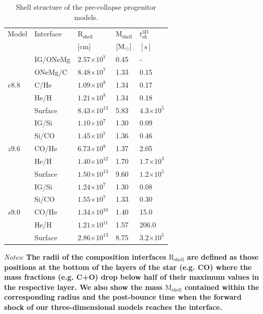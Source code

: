 \documentclass[fleqn,usenatbib]{mnras}
\newcommand{\solm}{\ensuremath{\rm{M_{\odot}}}\xspace}
\newcommand{\s}{\ensuremath{\text{s}}}
\begin{document}
\begin{table}
   \caption{Shell structure of the pre-collapse progenitor models.}
   \label{tab:progenitors}
   \begin{tabular}{l l l l l} 
   \hline
     Model      &Interface & $\mathrm{R_{shell}\,}$ & $\mathrm{M_{shell}}$ & $t_{\mathrm{sh}}^{\mathrm{3D}}$\\ [0.5ex] 
                &          & [cm] & $[\solm]$ & $[\s]$\\ [0.5ex] 
   \hline
   \multirow{5}{*}{$e8.8$} & IG/ONeMg & $2.57\mathord{\times} 10^{7}$  & 0.45 & - \\ 
                           & ONeMg/C    & $8.48\mathord{\times} 10^{7}$  & 1.33 & 0.15 \\
                           & C/He       & $1.09\mathord{\times} 10^{8}$  & 1.34 & 0.17 \\
                           & He/H       & $1.21\mathord{\times} 10^{8}$  & 1.34 & 0.18\\
                           & Surface    & $8.43\mathord{\times} 10^{13}$ & 5.83 & $4.3\mathord{\times}10^5$\\
   \hline
   \multirow{5}{*}{$z9.6$} & IG/Si    & $1.10\mathord{\times} 10^{7}$  & 1.30 & 0.09 \\ 
                           & Si/CO       & $1.45\mathord{\times} 10^{7}$  & 1.36 & 0.46\\ 
                           & CO/He      & $6.73\mathord{\times} 10^{8}$  & 1.37 & 2.05\\
                           & He/H       & $1.40\mathord{\times} 10^{12}$ & 1.70 & $1.7\mathord{\times}10^{3}$\\
                           & Surface    & $1.50\mathord{\times} 10^{13}$ & 9.60 & $1.2\mathord{\times}10^5$  \\
   \hline
   \multirow{5}{*}{$s9.0$} & IG/Si    & $1.24\mathord{\times} 10^{7}$   & 1.30 & 0.08 \\ 
                           & Si/CO       & $1.55\mathord{\times} 10^{7}$   & 1.33 & 0.30 \\ 
                           & CO/He      & $1.34\mathord{\times} 10^{10}$  & 1.40 & 15.0 \\
                           & He/H       & $1.21\mathord{\times} 10^{11}$  & 1.57 & 206.0 \\
                           & Surface    & $2.86\mathord{\times} 10^{13}$  & 8.75 & $3.2\mathord{\times} 10^5$ \\
  \hline
   \end{tabular}

\flushleft
\textit{Notes}: \textbf{The radii of the composition interfaces $\mathrm{R}_{\mathrm{shell}}$ are defined as those positions at the bottom of the layers of the star (e.g. CO) where the mass fractions (e.g. C+O) drop below half of their maximum values in the respective layer. We also show the mass $\mathrm{M}_{\mathrm{shell}}$ contained within the corresponding radius and the post-bounce time when the forward shock of our three-dimensional models reaches the interface.}
\end{table}
\end{document}
